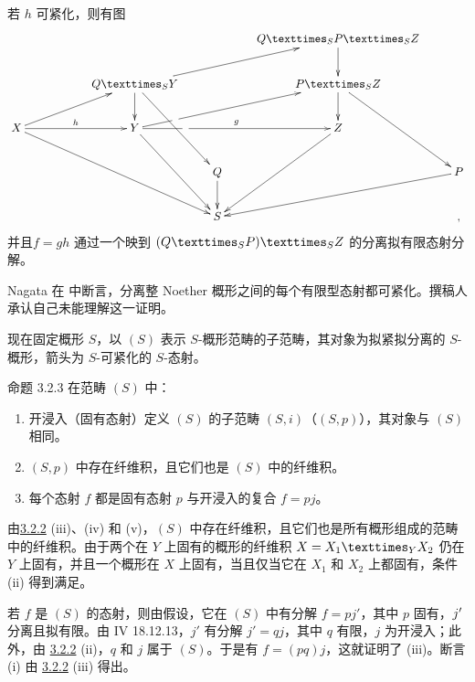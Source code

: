 若 $h$ 可紧化，则有图
\[
\xymatrix{
  &&                & &\sisi{Q\times P \times Z}{\fprod{\fprod{Q}{P}{S}}{Z}{S}} \ar[d]&\\
  &&\fprod{Q}{Y}{S} \ar[d]\ar[rru]\ar[rdd]& & \fprod{P}{Z}{S} \ar[d]\ar[rdd] & \\
X \ar[rrrdd]\ar[rru] \ar[rr]^{h}&& Y \sisi{\ar[rru]}{\ar[rru]|(.2)\hole} \ar[rdd]\sisi{\ar[rr]^{g}}{\ar[rr]^g|(.25)\hole}            & & Z\ar[ldd]                & \\
  &&                &Q\ar[d]&                  &P\ar[lld] \\
  &&                &S&                   &,
}
\]
并且\pageoriginale $f=gh$ 通过一个映到 $\fprod{(\fprod{Q}{P}{S})}{Z}{S}$ 的分离拟有限态射分解。

Nagata 在  中断言，分离整 Noether 概形之间的每个有限型态射都可紧化。撰稿人承认自己未能理解这一证明。

现在固定概形 $S$，以 $(S)$ 表示 $S$-概形范畴的子范畴，其对象为拟紧拟分离的 $S$-概形，箭头为 $S$-可紧化的 $S$-态射。

\begin{enonce*}{命题 3.2.3}
在范畴 $(S)$ 中：
\begin{enumerate}
\renewcommand{\theenumi}{\roman{enumi}}
\renewcommand{\labelenumi}{(\theenumi)}
\item 开浸入（\resp 固有态射）定义 $(S)$ 的子范畴 $(S,i)$（\resp $(S,p)$），其对象与 $(S)$ 相同。

\item $(S,p)$ 中存在纤维积，且它们也是 $(S)$ 中的纤维积。

\item 每个态射 $f$ 都是固有态射 $p$ 与开浸入的复合 $f=pj$。
\end{enumerate}
\end{enonce*}

由\pageoriginale \hyperref[XVII.prop3.2.2]{3.2.2} (iii)、(iv) 和 (v)，$(S)$ 中存在纤维积，且它们也是所有概形组成的范畴中的纤维积。由于两个在 $Y$ 上固有的概形的纤维积 $X=\fprod{X_1}{X_2}{Y}$ 仍在 $Y$ 上固有，并且一个概形在 $X$ 上固有，当且仅当它在 $X_1$ 和 $X_2$ 上都固有，条件 (ii) 得到满足。

若 $f$ 是 $(S)$ 的态射，则由假设，它在 $(S)$ 中有分解 $f=pj'$，其中 $p$ 固有，$j'$ 分离且拟有限。由 \EGA IV 18.12.13，$j'$ 有分解 $j'=qj$，其中 $q$ 有限，$j$ 为开浸入；此外，由 \hyperref[XVII.prop3.2.2]{3.2.2} (ii)，$q$ 和 $j$ 属于 $(S)$。于是有 $f=(pq)j$，这就证明了 (iii)。断言 (i) 由 \hyperref[XVII.prop3.2.2]{3.2.2} (iii) 得出。

